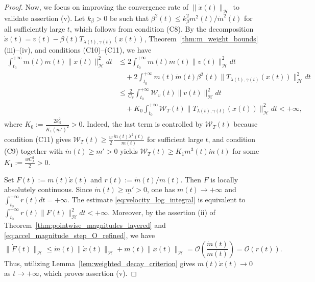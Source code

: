 \documentclass{article}
\theoremstyle{definition}
\theoremstyle{definition}
\theoremstyle{definition}
\begin{document}
\begin{proof}
Now, we focus on improving the convergence rate of $\|\dot{x}(t)\|_{\mathcal{H}}$ to validate assertion (v). Let $k_{\beta}>0$ be such that $\beta^2(t)\le k_{\beta}^2m^2(t)/\dot m^2(t)$ for all sufficiently large $t$, which follows from condition {\rm (C8)}. By the decomposition $\dot{x}(t)=v(t)-\beta(t)T_{\lambda(t),\gamma(t)}(x(t))$, Theorem~\ref{thm:m_weight_bounds}(iii)--(iv), and conditions {\rm (C10)}--{\rm (C11)}, we have
\begin{align}
\int_{t_0}^{+\infty}m(t)\dot m(t)\|\dot{x}(t)\|_{\mathcal{H}}^2dt
&\le 2\int_{t_0}^{+\infty}m(t)\dot m(t)\|v(t)\|_{\mathcal{H}}^2dt \nonumber\\
&\quad +2\int_{t_0}^{+\infty}m(t)\dot m(t)\beta^2(t)\|T_{\lambda(t),\gamma(t)}(x(t))\|_{\mathcal{H}}^2dt \nonumber\\
&\le \frac{2}{C_v}\int_{t_0}^{+\infty}\mathcal{W}_v(t)\|v(t)\|_{\mathcal{H}}^2dt \nonumber\\
&\quad +K_0\int_{t_0}^{+\infty}\mathcal{W}_T(t)\|T_{\lambda(t),\gamma(t)}(x(t))\|_{\mathcal{H}}^2dt<+\infty,
\label{eq:velocity_log_integral}
\end{align}
where $K_0:=\frac{2k_{\beta}^2}{K_1(\underline m')^2}>0$. Indeed, the last term is controlled by $\mathcal{W}_T(t)$ because condition {\rm (C11)} gives $\mathcal{W}_T(t)\ge \frac{w}{2}\frac{\dot m(t)\lambda^2(t)}{m(t)}$ for sufficient large $t$, and condition {\rm (C9)} together with $\dot m(t)\ge\underline m'>0$ yields $\mathcal{W}_T(t)\ge K_1m^3(t)\dot m(t)$ for some  $K_1:=\frac{wC_\lambda^2}{2}>0$.

Set $F(t):=m(t)\dot{x}(t)$ and $r(t):=\dot m(t)/m(t)$. Then $F$ is locally absolutely continuous. Since $\dot m(t)\ge\underline m'>0$, one has $m(t)\to+\infty$ and $\int_{t_0}^{+\infty}r(t)dt=+\infty$. The estimate \eqref{eq:velocity_log_integral} is equivalent to $\int_{t_0}^{+\infty}r(t)\|F(t)\|_{\mathcal{H}}^2dt<+\infty$.
Moreover, by the assertion {\rm (ii)} of Theorem~\ref{thm:pointwise_magnitudes_layered} and \eqref{eq:accel_magnitude_step_O_refined}, we have
\[
\|\dot F(t)\|_{\mathcal{H}}
\le \dot m(t)\|\dot x(t)\|_{\mathcal{H}}+m(t)\|\ddot x(t)\|_{\mathcal{H}}
=\mathcal{O}\left(\frac{\dot m(t)}{m(t)}\right)
=\mathcal{O}(r(t)).
\]
Thus, utilizing Lemma~\ref{lem:weighted_decay_criterion} gives $m(t)\dot{x}(t)\to0$ as $t \to +\infty$, which proves assertion (v).


\end{proof}
\end{document}
